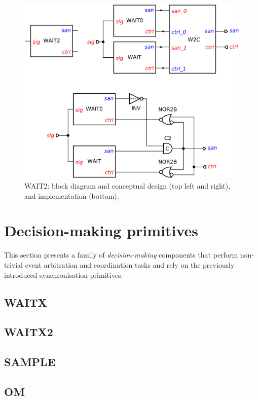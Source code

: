 \documentclass[conference]{IEEEtran}
\begin{document}
\begin{figure}
\begin{center}
    \includegraphics[scale=0.23]{fig/WAIT2.pdf}
    \caption{\textsf{WAIT2}: block diagram and conceptual design (top left and right),
    and implementation (bottom).}
    \label{fig:wait2}
\end{center}
\end{figure}

\section{Decision-making primitives}\label{sec-decision}

This section presents a family of \emph{decision-making} components that perform
non-trivial event arbitration and coordination tasks and rely on the previously
introduced synchronisation primitives.

\subsection{WAITX}
\subsection{WAITX2}
\subsection{SAMPLE}
\subsection{OM}
\end{document}
